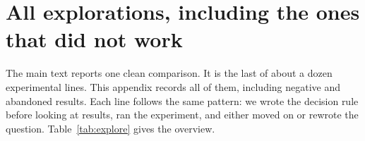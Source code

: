 \section{All explorations, including the ones that did not work}
\label{app:explorations}

The main text reports one clean comparison. It is the last of about a dozen experimental lines. This appendix records all of them, including negative and abandoned results. Each line follows the same pattern: we wrote the decision rule before looking at results, ran the experiment, and either moved on or rewrote the question. Table~\ref{tab:explore} gives the overview.

